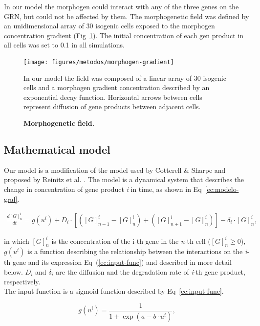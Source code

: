 \documentclass[10pt,letterpaper]{article}
\begin{document}
In our model the morphogen could interact with any of the three genes on the 
GRN, but could not be affected by them. The morphogenetic field was defined by 
an unidimensional array of 30 isogenic cells exposed to the morphogen 
concentration gradient (Fig~\ref{fig:morfgrad}). The initial concentration of 
each gen product in all cells was set to 0.1 in all simulations.\\

\begin{figure}[!h]
 \texttt{[image: figures/metodos/morphogen-gradient]}
 \caption{\bf Morphogenetic field.}
 In our model the field was composed of a linear array of 30 isogenic cells and 
 a morphogen gradient concentration described by an exponential decay function. 
 Horizontal arrows between cells represent diffusion of gene products between 
 adjacent cells.
 \label{fig:morfgrad}
\end{figure}

\subsection*{Mathematical model}

Our model is a modification of the model used by Cotterell \& Sharpe 
\cite{Cotterell2010} and proposed by Reinitz et al. \cite{Reinitz1995}. The 
model is a dynamical system that describes the change in concentration of gene 
product \emph{i} in time, as shown in Eq~\ref{ec:modelo-gral}.

 \begin{eqnarray}
  \frac{d[G]^i_n}{dt}
  = g(u^i) + D_i \cdot [ ([G]^i_{n-1}-[G]^i_n) +([G]^i_{n+1}-[G]^i_n)]-\delta_i 
  \cdot [ G ]^i_n ,
  \label{ec:modelo-gral}
 \end{eqnarray}

in which $[G]^{i}_{n}$ is the concentration of the i-th gene in the \emph{n}-th 
cell ($[G]^{i}_{n} ≥ 0$), $g(u^i)$ is a function describing the relationship 
between the interactions on the \emph{i}-th gene and its expression 
Eq~(\ref{ec:input-func}) and described in more detail below. $D_i$ and 
$\delta_i$ are the diffusion and the degradation rate of \emph{i}-th gene 
product, respectively.\\

The input function is a sigmoid function described by Eq~\ref{ec:input-func}.

\begin{equation}
 g(u^i) = \frac{1}{1 + \exp(a - b \cdot u^i)},
 \label{ec:input-func}
\end{equation}
\end{document}
